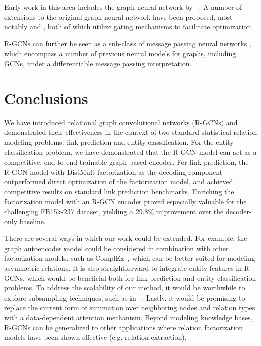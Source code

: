 \documentclass[letterpaper]{article} \usepackage{aaai18}  \usepackage{times}  \usepackage{helvet}  \usepackage{courier}  \usepackage{url}  \usepackage{graphicx}  \frenchspacing
\newcommand{\citet}[1]{\citeauthor{#1}~\shortcite{#1}}
\begin{document}
Early work in this area includes the graph neural network by \citet{scarselli2009graph}. A number of extensions to the original graph neural network have been proposed, most notably \cite{li2015gated} and \cite{pham2016column}, both of which utilize gating mechanisms to facilitate optimization.

R-GCNs can further be seen as a sub-class of message passing neural networks \cite{gilmer2017neural}, which encompass a number of previous neural models for graphs, including GCNs, under a differentiable message passing interpretation.
 
\section{Conclusions}

We have introduced relational graph convolutional networks (R-GCNs) and demonstrated their effectiveness in the context of two standard statistical relation modeling problems: link prediction and entity classification. For the entity classification problem, we have demonstrated that the R-GCN model can act as a competitive, end-to-end trainable graph-based encoder. For link prediction, the R-GCN model with DistMult factorization as the decoding component outperformed direct optimization of the factorization model, and achieved competitive results on standard link prediction benchmarks. Enriching the factorization model with an R-GCN encoder proved especially valuable for the challenging FB15k-237 dataset, yielding a 29.8\% improvement over the decoder-only baseline.

There are several ways in which our work could be extended. For example, the graph autoencoder model could be considered in combination with other factorization models, such as ComplEx~\cite{complex-complex_embeddings_for_simple_link_prediction}, which can be better suited for modeling asymmetric relations. It is also straightforward to integrate entity features in R-GCNs, which would be beneficial both for link prediction and entity classification problems. To address the scalability of our method, it would be worthwhile to explore subsampling techniques, such as in \citet{hamilton2017inductive}. Lastly, it would be promising to replace the current form of summation over neighboring nodes and relation types with a data-dependent attention mechanism. Beyond modeling knowledge bases, R-GCNs can be generalized to other applications where relation factorization models have been shown effective (e.g. relation extraction). 
 
\end{document}
